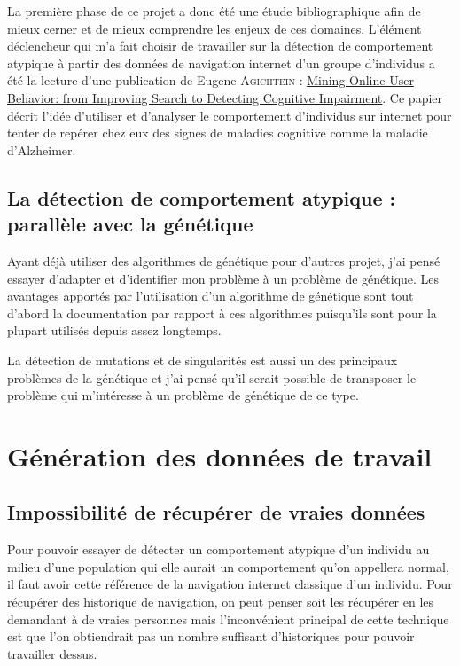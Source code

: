 \documentclass[a4paper, 11pt]{article}
\begin{document}
La première phase de ce projet a donc été une étude bibliographique afin de mieux cerner et de mieux comprendre les enjeux de ces domaines. L'élément déclencheur qui m'a fait choisir de travailler sur la détection de comportement atypique à partir des données de navigation internet d'un groupe d'individus a été la lecture d'une publication de Eugene A\textsc{gichtein} : \href{http://www.cse.lehigh.edu/academics/graduate-programs/graduate-computer-engineering/2-uncategorised/235-agichtein}{Mining Online User Behavior: from Improving Search to Detecting Cognitive Impairment}. Ce papier décrit l'idée d'utiliser et d'analyser le comportement d'individus sur internet pour tenter de repérer chez eux des signes de maladies cognitive comme la maladie d'Alzheimer.

\subsection{La détection de comportement atypique : parallèle avec la génétique}

Ayant déjà utiliser des algorithmes de génétique pour d'autres projet, j'ai pensé essayer d'adapter et d'identifier mon problème à un problème de génétique. Les avantages apportés par l'utilisation d'un algorithme de génétique sont tout d'abord la documentation par rapport à ces algorithmes puisqu'ils sont pour la plupart utilisés depuis assez longtemps. 

La détection de mutations et de singularités est aussi un des principaux problèmes de la génétique et j'ai pensé qu'il serait possible de transposer le problème qui m'intéresse à un problème de génétique de ce type.

\section{Génération des données de travail}

\subsection{Impossibilité de récupérer de vraies données}
Pour pouvoir essayer de détecter un comportement atypique d'un individu au milieu d'une population qui elle aurait un comportement qu'on appellera normal, il faut avoir cette référence de la navigation internet classique d'un individu. Pour récupérer des historique de navigation, on peut penser soit les récupérer en les demandant à de vraies personnes mais l'inconvénient principal de cette technique est que l'on obtiendrait pas un nombre suffisant d'historiques pour pouvoir travailler dessus. 
\end{document}
